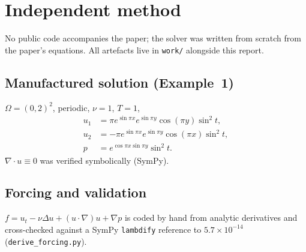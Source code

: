 \documentclass[11pt]{article}
\begin{document}
\section{Independent method}

No public code accompanies the paper; the solver was written from scratch
from the paper's equations. All artefacts live in
\texttt{work/} alongside this report.

\subsection{Manufactured solution (Example~1)}
$\Omega=(0,2)^2$, periodic, $\nu=1$, $T=1$,
\begin{align*}
u_1 &= \pi e^{\sin\pi x}e^{\sin\pi y}\cos(\pi y)\sin^2 t,\\
u_2 &= -\pi e^{\sin\pi x}e^{\sin\pi y}\cos(\pi x)\sin^2 t,\\
p   &= e^{\cos\pi x\sin\pi y}\sin^2 t .
\end{align*}
$\nabla\cdot u\equiv 0$ was verified symbolically (SymPy).

\subsection{Forcing and validation}
$f=u_t-\nu\Delta u+(u\cdot\nabla)u+\nabla p$ is coded by hand from analytic
derivatives and cross-checked against a SymPy \texttt{lambdify} reference to
$5.7\times10^{-14}$ (\texttt{derive\_forcing.py}).
\end{document}
